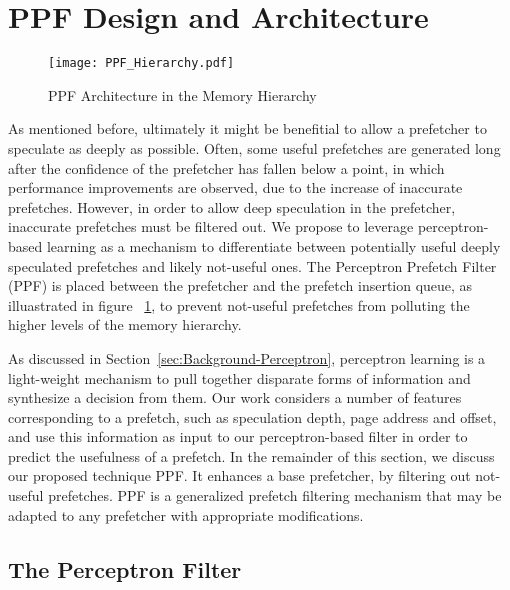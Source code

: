 \section{PPF Design and Architecture}
\label{Arch}

\begin{figure}
  \begin{center}
  \texttt{[image: PPF\_Hierarchy.pdf]}
    \label{fig:PPF_Hierarchy}
  \caption{PPF Architecture in the Memory Hierarchy}
  \end{center}
\end{figure}

As mentioned before, ultimately it might be benefitial to allow a
prefetcher to speculate as deeply as possible. Often, some useful
prefetches are generated long after the confidence of the prefetcher has
fallen below a point, in which performance improvements are observed, due to the
increase of inaccurate prefetches.  However, in order to allow deep
speculation in the prefetcher, inaccurate prefetches must be
filtered out.  We propose to leverage perceptron-based learning as a
mechanism to differentiate between potentially useful deeply speculated
prefetches and likely not-useful ones. The Perceptron Prefetch Filter (PPF)
is placed between the prefetcher and the prefetch insertion queue, as illuastrated
in figure ~\ref{fig:PPF_Hierarchy}, to prevent
not-useful prefetches from polluting the higher levels of the memory hierarchy.

As discussed in Section~\ref{sec:Background-Perceptron}, perceptron learning
is a light-weight mechanism to pull together disparate forms of information
and synthesize a decision from them.  Our work considers a number of
features corresponding to a prefetch, such as speculation
depth, page address and offset, and use this information as input to our perceptron-based filter in order to predict the usefulness of a prefetch.
In the remainder of this section, we discuss our proposed technique PPF.
It enhances a base prefetcher, by filtering out not-useful prefetches. 
PPF is a generalized prefetch filtering mechanism that may be adapted 
to any prefetcher with appropriate modifications.

\subsection{The Perceptron Filter}
\label{Arch-Perceptron}

